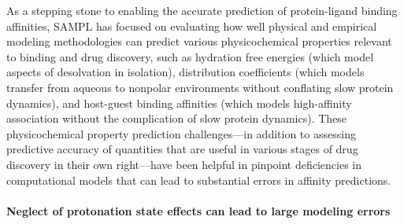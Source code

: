 \documentclass[9pt,lineno]{elife}
\begin{document}
As a stepping stone to enabling the accurate prediction of protein-ligand binding affinities, SAMPL has focused on evaluating how well physical and empirical modeling methodologies can predict various physicochemical properties relevant to binding and drug discovery, such as hydration free energies (which model aspects of desolvation in isolation), distribution coefficients (which models transfer from aqueous to nonpolar environments without conflating slow protein dynamics), and host-guest binding affinities (which models high-affinity association without the complication of slow protein dynamics).
These physicochemical property prediction challenges---in addition to assessing predictive accuracy of quantities that are useful in various stages of drug discovery in their own right---have been helpful in pinpoint deficiencies in computational models that can lead to substantial errors in affinity predictions.

\paragraph{Neglect of protonation state effects can lead to large modeling errors}
\end{document}
